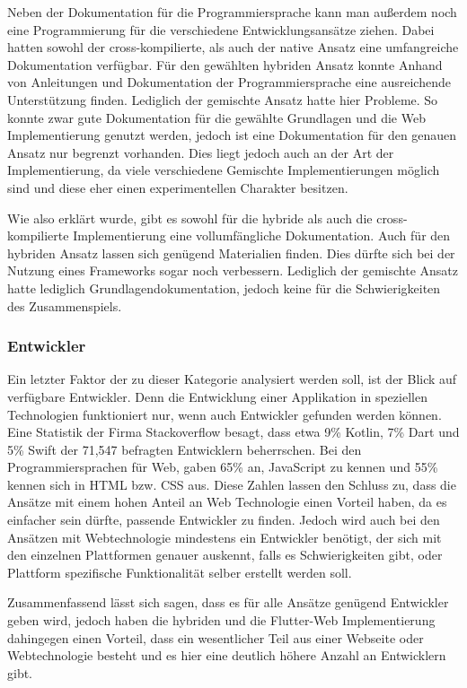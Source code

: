 Neben der Dokumentation für die Programmiersprache kann man außerdem noch eine Programmierung für die verschiedene Entwicklungsansätze ziehen. Dabei hatten sowohl der cross-kompilierte, als auch der native Ansatz eine umfangreiche Dokumentation verfügbar. Für den gewählten hybriden Ansatz konnte Anhand von Anleitungen und Dokumentation der Programmiersprache eine ausreichende Unterstützung finden. Lediglich der gemischte Ansatz hatte hier Probleme. So konnte zwar gute Dokumentation für die gewählte Grundlagen und die Web Implementierung genutzt werden, jedoch ist eine Dokumentation für den genauen Ansatz nur begrenzt vorhanden. Dies liegt jedoch auch an der Art der Implementierung, da viele verschiedene Gemischte Implementierungen möglich sind und diese eher einen experimentellen Charakter besitzen.

Wie also erklärt wurde, gibt es sowohl für die hybride als auch die cross-kompilierte Implementierung eine vollumfängliche Dokumentation. Auch für den hybriden Ansatz lassen sich genügend Materialien finden. Dies dürfte sich bei der Nutzung eines Frameworks sogar noch verbessern. Lediglich der gemischte Ansatz hatte lediglich Grundlagendokumentation, jedoch keine für die Schwierigkeiten des Zusammenspiels. 

\subsubsection{Entwickler}
Ein letzter Faktor der zu dieser Kategorie analysiert werden soll, ist der Blick auf verfügbare Entwickler. Denn die Entwicklung einer Applikation in speziellen Technologien funktioniert nur, wenn auch Entwickler gefunden werden können. Eine Statistik \cite{statist_used_programming_languages} der Firma Stackoverflow besagt, dass etwa 9\% Kotlin, 7\% Dart und 5\% Swift der 71,547 befragten Entwicklern beherrschen.
Bei den Programmiersprachen für Web, gaben  65\% an, JavaScript zu kennen und 55\% kennen sich in HTML bzw. CSS aus. Diese Zahlen lassen den Schluss zu, dass die Ansätze mit einem hohen Anteil an Web Technologie einen Vorteil haben, da es einfacher sein dürfte, passende Entwickler zu finden. Jedoch wird auch bei den Ansätzen mit Webtechnologie mindestens ein Entwickler benötigt, der sich mit den einzelnen Plattformen genauer auskennt, falls es Schwierigkeiten gibt, oder Plattform spezifische Funktionalität selber erstellt werden soll.

Zusammenfassend lässt sich sagen, dass es für alle Ansätze genügend Entwickler geben wird, jedoch haben die hybriden und die Flutter-Web Implementierung dahingegen einen Vorteil, dass ein wesentlicher Teil aus einer Webseite oder Webtechnologie besteht und es hier eine deutlich höhere Anzahl an Entwicklern gibt.

